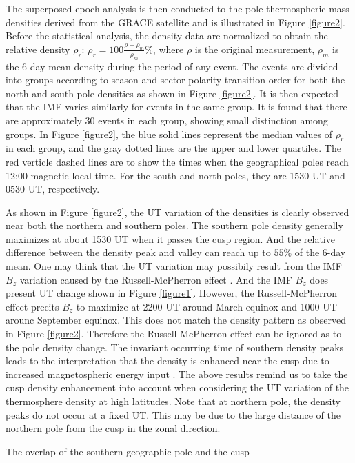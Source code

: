 \documentclass[draft,grl]{/home/guod/Documents/template/agu_template/AGUTeX}
\begin{document}
\begin{article}
    The superposed epoch analysis is then conducted to the pole thermospheric mass densities derived from the 
    GRACE satellite and is illustrated in Figure \ref{figure2}.
    Before the statistical analysis, the density data are normalized to obtain the relative  density $\rho_r$:
    $\rho_r=100\frac{\rho-\rho_m}{\rho_m}\%$, where $\rho$ is the original measurement, 
    $\rho_m$ is the 6-day mean density during the period of any event.
    The events are divided into groups according to season and sector polarity transition order for
    both the north and south pole densities as shown in Figure \ref{figure2}.
    It is then expected that the IMF varies similarly for events in the same group.
    It is found that there are approximately 30 events in each group, showing small distinction among groups.
    In Figure \ref{figure2}, the blue solid lines represent the median values of $\rho_r$ in 
    each group, and the gray dotted lines are the upper and lower quartiles. 
    The red verticle dashed lines are to show the times when the geographical poles reach 12:00 magnetic
    local time. 
    For the south and north poles, they are 1530 UT and 0530 UT, respectively.

    As shown in Figure \ref{figure2}, the UT variation of the densities is clearly observed 
    near both the northern and southern poles.
    The southern pole density generally maximizes at about 1530 UT when it passes the cusp region. 
    And the relative difference between the density peak and valley can reach up to $55\%$ of
    the 6-day mean.
    One may think that the UT variation may possibily result from the IMF $B_z$ variation caused by the
    Russell-McPherron effect \citep{Russell1973}. 
    And the IMF $B_z$ does present UT change shown in Figure \ref{figure1}. 
    However, the Russell-McPherron effect precits $B_z$ to maximize at 2200 UT around March equinox and 
    1000 UT arounc September equinox.
    This does not match the density pattern as observed in Figure \ref{figure2}.
    Therefore the Russell-McPherron effect can be ignored as to the pole density change.
    The invariant occurring time of southern density peaks leads to the interpretation that the density 
    is enhanced near the cusp due to increased magnetospheric energy input \citep{Luhr2004}.
    The above results remind us to take the cusp density enhancement into account when considering the
    UT variation of the thermosphere density at high latitudes.
    Note that at northern pole, the density peaks do not occur at a fixed UT. This may be due to the
    large distance of the northern pole from the cusp in the zonal direction.

    The overlap of the southern geographic pole and the cusp 


\end{article}
\end{document}
